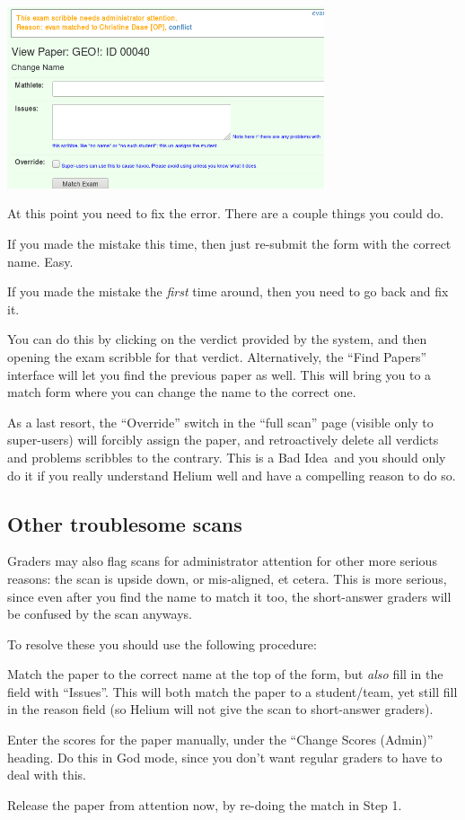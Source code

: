 \begin{center}
	\includegraphics[width=0.7\textwidth]{images/conflict2.png}
\end{center}

At this point you need to fix the error.
There are a couple things you could do.
\begin{itemize}
	\ii If you made the mistake this time,
	then just re-submit the form with the correct name. Easy.

	\ii If you made the mistake the \emph{first} time around,
	then you need to go back and fix it.

	You can do this by clicking on the verdict provided by the system,
	and then opening the exam scribble for that verdict.
	Alternatively, the ``Find Papers'' interface will let you find
	the previous paper as well.
	This will bring you to a match form where you can change the
	name to the correct one.

	\ii As a last resort,
	the ``Override'' switch in the ``full scan'' page (visible only to super-users)
	will forcibly assign the paper,
	and retroactively delete all verdicts and
	problems scribbles to the contrary.
	This is a Bad Idea\texttrademark\ and you should only do it
	if you really understand Helium well and have a compelling reason to do so.
\end{itemize}

\subsection{Other troublesome scans}
\label{sec:trouble_scan}
Graders may also flag scans for administrator attention for other 
more serious reasons:
the scan is upside down, or mis-aligned, et cetera.
This is more serious, since even after you find the name to match it too,
the short-answer graders will be confused by the scan anyways.

To resolve these you should use the following procedure:
\begin{enumerate}
	\ii Match the paper to the correct name at the top of the form,
	but \emph{also} fill in the field with ``Issues''.
	This will both match the paper to a student/team,
	yet still fill in the reason field
	(so Helium will not give the scan to short-answer graders).

	\ii Enter the scores for the paper manually,
	under the ``Change Scores (Admin)'' heading.
	Do this in God mode,
	since you don't want regular graders to have to deal with this.
	
	\ii Release the paper from attention now,
	by re-doing the match in Step 1.
\end{enumerate}

